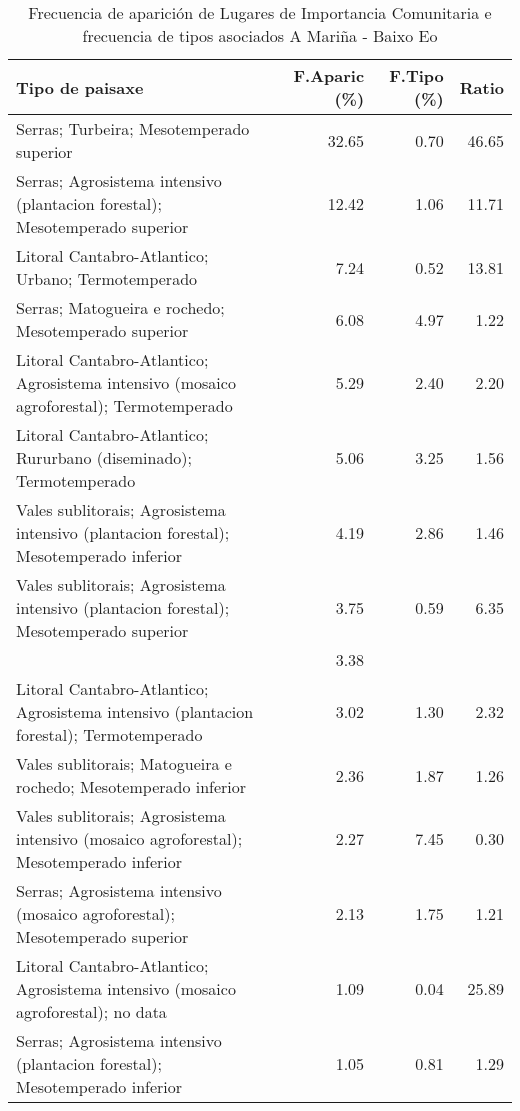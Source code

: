 \begin{table}[p]
\centering
\caption{Frecuencia de aparición de Lugares de Importancia Comunitaria e frecuencia de tipos asociados A Mariña - Baixo Eo} 
\label{vnatura2}
\begin{tabular}{lrrr}
  \hline
Tipo de paisaxe & F.Aparic (\%) & F.Tipo (\%) & Ratio \\ 
  \hline
Serras; Turbeira; Mesotemperado superior & 32.65 & 0.70 & 46.65 \\ 
  Serras; Agrosistema intensivo (plantacion forestal); Mesotemperado superior & 12.42 & 1.06 & 11.71 \\ 
  Litoral Cantabro-Atlantico; Urbano; Termotemperado & 7.24 & 0.52 & 13.81 \\ 
  Serras; Matogueira e rochedo; Mesotemperado superior & 6.08 & 4.97 & 1.22 \\ 
  Litoral Cantabro-Atlantico; Agrosistema intensivo (mosaico agroforestal); Termotemperado & 5.29 & 2.40 & 2.20 \\ 
  Litoral Cantabro-Atlantico; Rururbano (diseminado); Termotemperado & 5.06 & 3.25 & 1.56 \\ 
  Vales sublitorais; Agrosistema intensivo (plantacion forestal); Mesotemperado inferior & 4.19 & 2.86 & 1.46 \\ 
  Vales sublitorais; Agrosistema intensivo (plantacion forestal); Mesotemperado superior & 3.75 & 0.59 & 6.35 \\ 
   & 3.38 &  &  \\ 
  Litoral Cantabro-Atlantico; Agrosistema intensivo (plantacion forestal); Termotemperado & 3.02 & 1.30 & 2.32 \\ 
  Vales sublitorais; Matogueira e rochedo; Mesotemperado inferior & 2.36 & 1.87 & 1.26 \\ 
  Vales sublitorais; Agrosistema intensivo (mosaico agroforestal); Mesotemperado inferior & 2.27 & 7.45 & 0.30 \\ 
  Serras; Agrosistema intensivo (mosaico agroforestal); Mesotemperado superior & 2.13 & 1.75 & 1.21 \\ 
  Litoral Cantabro-Atlantico; Agrosistema intensivo (mosaico agroforestal); no data & 1.09 & 0.04 & 25.89 \\ 
  Serras; Agrosistema intensivo (plantacion forestal); Mesotemperado inferior & 1.05 & 0.81 & 1.29 \\ 
   \hline
\end{tabular}
\end{table}
